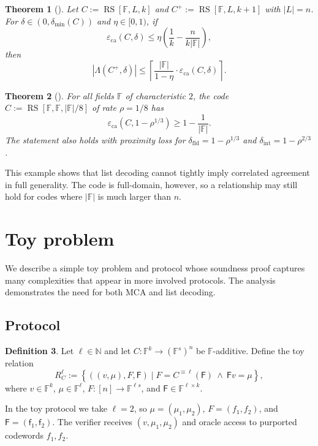 \documentclass[11pt]{article}
\theoremstyle{plain}
\newtheorem{theorem}{Theorem}[section]
\theoremstyle{definition}
\newtheorem{definition}[theorem]{Definition}
\newcommand{\F}{\mathbb{F}}
\newcommand{\N}{\mathbb{N}}
\newcommand{\RS}[3]{\operatorname{RS}[#1,#2,#3]}
\newcommand{\epsca}{\varepsilon_{\mathrm{ca}}}
\newcommand{\distmin}{\delta_{\min}}
\newcommand{\fld}{\mathrm{fld}}
\newcommand{\intr}{\mathrm{int}}
\newcommand{\set}[1]{\left\{#1\right\}}
\newcommand{\abs}[1]{\left|#1\right|}
\begin{document}
\begin{theorem}[\cite{CS25}]
Let $C:=\RS{\F}{L}{k}$ and $C^+:=\RS{\F}{L}{k+1}$ with $\abs{L}=n$. For $\delta\in(0,\distmin(C))$ and $\eta\in[0,1)$, if
\[
  \epsca(C,\delta)\le \eta\left(\frac1k-\frac{n}{k\abs{\F}}\right),
\]
then
\[
  \abs{\Lambda(C^+,\delta)}\le
  \left\lceil \frac{\abs{\F}}{1-\eta}\cdot\epsca(C,\delta)\right\rceil.
\]
\end{theorem}

\begin{theorem}[\cite{BGKS20}]
For all fields $\F$ of characteristic $2$, the code $C:=\RS{\F}{\F}{\abs{\F}/8}$ of rate $\rho=1/8$ has
\[
  \epsca\left(C,1-\rho^{1/3}\right)
  \ge 1-\frac1{\abs{\F}}.
\]
The statement also holds with proximity loss for $\delta_{\fld}=1-\rho^{1/3}$ and $\delta_{\intr}=1-\rho^{2/3}$.
\end{theorem}

This example shows that list decoding cannot tightly imply correlated agreement in full generality. The code is full-domain, however, so a relationship may still hold for codes where $\abs{\F}$ is much larger than $n$.

\section{Toy problem}\label{sec:toy}

We describe a simple toy problem and protocol whose soundness proof captures many complexities that appear in more involved protocols. The analysis demonstrates the need for both MCA and list decoding.

\subsection{Protocol}

\begin{definition}
Let $\ell\in\N$ and let $C:\F^k\to(\F^s)^n$ be $\F$-additive. Define the toy relation
\[
R_C^\ell:=\set{((v,\mu),F,\mathsf{F})\mid
F=C^{\equiv\ell}(\mathsf{F})\ \wedge\ \mathsf{F}v=\mu},
\]
where $v\in\F^k$, $\mu\in\F^\ell$, $F:[n]\to\F^{\ell s}$, and $\mathsf{F}\in\F^{\ell\times k}$.
\end{definition}

In the toy protocol we take $\ell=2$, so $\mu=(\mu_1,\mu_2)$, $F=(f_1,f_2)$, and $\mathsf{F}=(\mathsf{f}_1,\mathsf{f}_2)$. The verifier receives $(v,\mu_1,\mu_2)$ and oracle access to purported codewords $f_1,f_2$.
\end{document}
